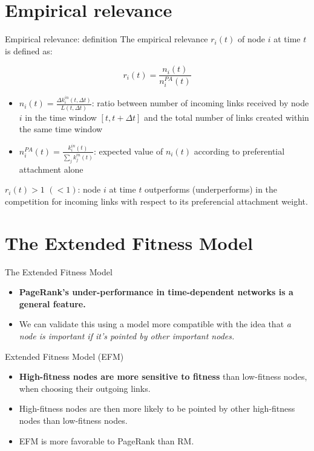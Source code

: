 \section{Empirical relevance}
\begin{frame}{Empirical relevance: definition}
    The \alert{empirical relevance} $r_i(t)$ of node $i$ at time $t$ is defined as:

    \[
        r_i(t) = \frac{n_i(t)}{n_i^{PA}(t)}
    \]

    \begin{itemize}
        \item $n_i(t) = \frac{\Delta k_i^{in}(t, \Delta t)}{L(t, \Delta t)}$: ratio between number of incoming links received by node $i$ in the time window $[t, t+\Delta t]$ and the total number of links created within the same time window
        \item $n_i^{PA}(t) = \frac{k_i^{in}(t)}{\sum_j k_j^{in}(t)}$: expected value of $n_i(t)$ according to preferential attachment alone
    \end{itemize}

    $r_i(t) > 1$ \alert{$(< 1)$}: node $i$ at time $t$ outperforms \alert{(underperforms)} in the competition for incoming links with respect to its preferencial attachment weight.
\end{frame}

\section{The Extended Fitness Model}

\begin{frame}{The Extended Fitness Model}
    \begin{itemize}
        \item \textbf{PageRank's under-performance in time-dependent networks is a general feature.}
        \item We can validate this using a model more compatible with the idea that \emph{a node is important if it's pointed by other important nodes.}
    \end{itemize}
    \begin{center}
        \alert{Extended Fitness Model} (EFM)
    \end{center}
    \begin{itemize}
        \item \textbf{High-fitness nodes are more sensitive to fitness} than low-fitness nodes, when choosing their outgoing links.
        \item High-fitness nodes are then more likely to be pointed by other high-fitness nodes than low-fitness nodes.
        \item EFM is \alert{more favorable} to PageRank than RM.
    \end{itemize}
\end{frame}

